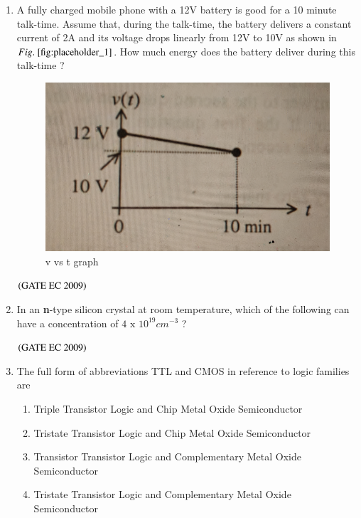 \documentclass[journal,12pt,onecolumn]{IEEEtran}
\theoremstyle{remark}
\begin{document}
\begin{enumerate}[start=1, label={Q\arabic*.}]
\item A fully charged mobile phone with a 12V battery is good for a 10 minute talk-time. Assume that, during the talk-time, the battery delivers a constant current of 2A and its voltage drops linearly from 12V to 10V as shown in $\figref{fig:placeholder_1}$. How much energy does the battery deliver during this talk-time ?
\begin{figure}
    \centering
    \includegraphics[width=0.5\columnwidth]{figs/img_1.jpg}
    \caption{v vs t graph}
    \label{fig:placeholder_1}
\end{figure}


\begin{enumerate}
\end{enumerate}
\hfill $\left(\text{GATE EC 2009}\right)$
\item In an \textbf{n}-type silicon crystal at room temperature, which of the following can have a concentration of $4 \text{ x } 10^{19}  cm^{-3}$ ?

\begin{enumerate}
\end{enumerate}
\hfill $\left(\text{GATE EC 2009}\right)$
\item The full form of abbreviations TTL and CMOS in reference to logic families are 
\begin{enumerate}
\item Triple Transistor Logic and Chip Metal Oxide Semiconductor
\item Tristate Transistor Logic and Chip Metal Oxide Semiconductor
\item Transistor Transistor Logic and Complementary Metal Oxide Semiconductor
\item Tristate Transistor Logic and Complementary Metal Oxide Semiconductor


\end{enumerate}
\end{enumerate}
\end{document}
